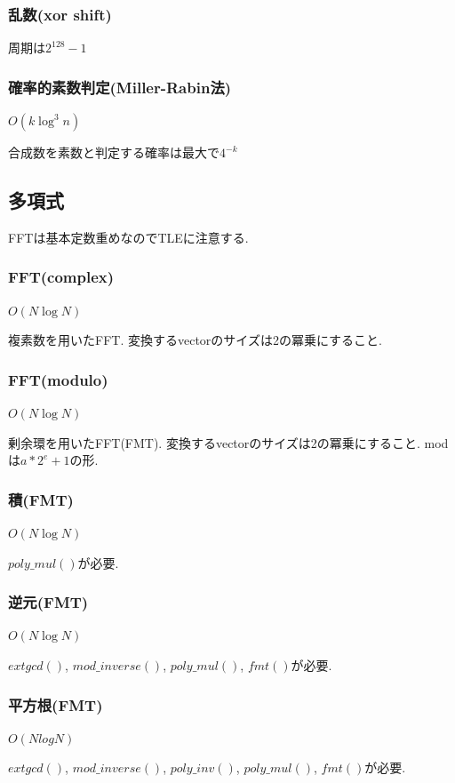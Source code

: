 \subsubsection{乱数(xor shift)}
周期は$2^{128}-1$


\subsubsection{確率的素数判定(Miller-Rabin法)}
$O(k\log^3n)$\par
合成数を素数と判定する確率は最大で$4^{-k}$\\


\subsection{多項式}
FFTは基本定数重めなのでTLEに注意する.
\subsubsection{FFT(complex)}
$O(N \log N)$\par
複素数を用いたFFT. 変換するvectorのサイズは2の冪乗にすること.


\subsubsection{FFT(modulo)}
$O(N \log N)$\par
剰余環を用いたFFT(FMT). 変換するvectorのサイズは2の冪乗にすること. modは$a*2^e+1$の形.\\


\subsubsection{積(FMT)}
$O(N \log N)$\par
$poly\_mul()$が必要.


\subsubsection{逆元(FMT)}
$O(N \log N)$\par
$extgcd()$, $mod\_inverse()$, $poly\_mul()$, $fmt()$が必要.


\subsubsection{平方根(FMT)}
$O(N log N)$\par
$extgcd()$, $mod\_inverse()$, $poly\_inv()$, $poly\_mul()$, $fmt()$が必要.



